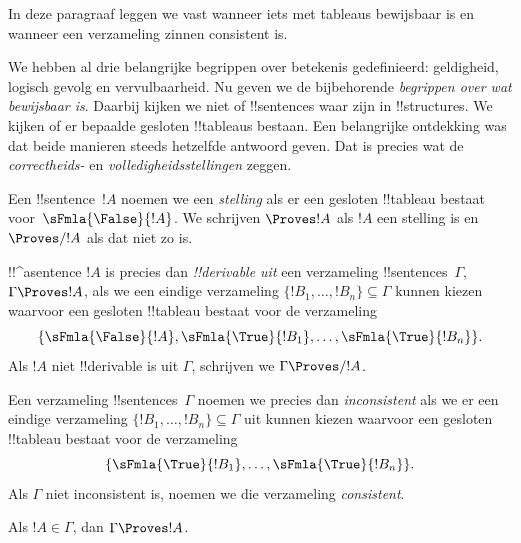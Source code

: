 \documentclass[openany]{memoir}
\begin{document}

\begin{editorial}
In deze paragraaf leggen we vast wanneer iets met tableaus bewijsbaar
is en wanneer een verzameling zinnen consistent is.
\end{editorial}

\begin{explain}
We hebben al drie belangrijke begrippen over betekenis gedefinieerd:
geldigheid, logisch gevolg en vervulbaarheid. Nu geven we de
bijbehorende \emph{begrippen over wat bewijsbaar is}. Daarbij kijken we
niet of !!{sentence}s waar zijn in !!{structure}s. We kijken of er
bepaalde gesloten !!{tableau}s bestaan. Een belangrijke ontdekking was
dat beide manieren steeds hetzelfde antwoord geven. Dat is precies wat
de \emph{correctheids-} en \emph{volledigheidsstellingen} zeggen.
\end{explain}


\begin{defn}[Stellingen]
Een !!{sentence}~$!A$ noemen we een \emph{stelling} als er een gesloten
!!{tableau} bestaat voor~$\sFmla{\False}{!A}$. We schrijven
$\Proves !A$ als $!A$ een stelling is en $\Proves/ !A$ als dat niet
zo is.
\end{defn}

\begin{defn}[!!^{derivability}]
!!^a{sentence} $!A$ is precies dan \emph{!!{derivable} uit} een
verzameling !!{sentence}s~$\Gamma$, $\Gamma \Proves !A$, als we een
eindige verzameling
$\{!B_1, \dots, !B_n\} \subseteq \Gamma$ kunnen kiezen waarvoor een
gesloten !!{tableau} bestaat voor de verzameling
\[
\{
  \sFmla{\False}{!A},
  \sFmla{\True}{!B_1}, \dots,
  \sFmla{\True}{!B_n}
  \}.
\]
Als $!A$ niet !!{derivable} is uit $\Gamma$, schrijven we
$\Gamma \Proves/ !A$.
\end{defn}

\begin{defn}[Consistentie]
Een verzameling !!{sentence}s~$\Gamma$ noemen we precies dan
\emph{inconsistent} als we er een eindige verzameling
$\{!B_1, \dots, !B_n\} \subseteq \Gamma$ uit kunnen kiezen waarvoor
een gesloten !!{tableau} bestaat voor de verzameling
\[
\{
  \sFmla{\True}{!B_1}, \dots,
  \sFmla{\True}{!B_n}  
  \}.
\]
Als $\Gamma$ niet inconsistent is, noemen we die verzameling
\emph{consistent}.
\end{defn}

\begin{prop}
Als $!A \in \Gamma$, dan $\Gamma \Proves !A$.
\end{prop}
\end{document}
